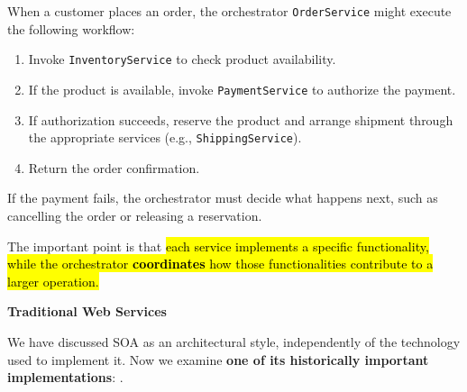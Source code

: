 \begin{examplebox}
\begin{center}
    \end{center}

    When a customer places an order, the orchestrator \texttt{OrderService} might execute the following workflow:
    \begin{enumerate}
        \item Invoke \texttt{InventoryService} to check product availability.
        \item If the product is available, invoke \texttt{PaymentService} to authorize the payment.
        \item If authorization succeeds, reserve the product and arrange shipment through the appropriate services (e.g., \texttt{ShippingService}).
        \item Return the order confirmation.
    \end{enumerate}
    If the payment fails, the orchestrator must decide what happens next, such as cancelling the order or releasing a reservation.

    \highspace
    The important point is that \hl{each service implements a specific functionality, while the orchestrator \textbf{coordinates} how those functionalities contribute to a larger operation.}
\end{examplebox}

\newpage

\begin{flushleft}
    \textcolor{Green3}{ \textbf{Traditional Web Services}}
\end{flushleft}
We have discussed SOA as an architectural style, independently of the technology used to implement it. Now we examine \textbf{one of its historically important implementations}: .

